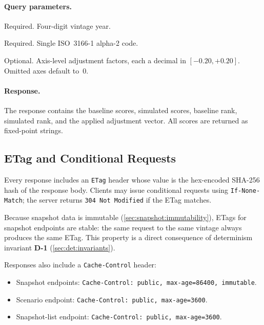 \paragraph{Query parameters.}
\begin{description}[style=nextline, leftmargin=5em, labelwidth=4.5em]
  \item[\texttt{vintage}] Required.  Four-digit vintage year.
  \item[\texttt{country}] Required.  Single ISO~3166-1 alpha-2 code.
  \item[\texttt{a1} \ldots\ \texttt{a6}] Optional.  Axis-level adjustment
    factors, each a decimal in \([-0.20, +0.20]\).  Omitted axes default
    to~\(0\).
\end{description}

\paragraph{Response.}
The response contains the baseline scores, simulated scores, baseline rank,
simulated rank, and the applied adjustment vector.  All scores are returned
as fixed-point strings.

\subsection{ETag and Conditional Requests}\label{sec:api:etag}

Every response includes an \texttt{ETag} header whose value is the
hex-encoded SHA-256 hash of the response body.  Clients may issue
conditional requests using \texttt{If-None-Match}; the server returns
\texttt{304 Not Modified} if the ETag matches.

Because snapshot data is immutable (\cref{sec:snapshot:immutability}),
ETags for snapshot endpoints are stable: the same request to the same
vintage always produces the same ETag.  This property is a direct
consequence of determinism invariant \textbf{D-1}
(\cref{sec:det:invariants}).

Responses also include a \texttt{Cache-Control} header:
\begin{itemize}
  \item Snapshot endpoints:\newline
        \texttt{Cache-Control:\ public,\ max-age=86400,\ immutable}.
  \item Scenario endpoint:
        \texttt{Cache-Control:\ public,\ max-age=3600}.
  \item Snapshot-list endpoint:
        \texttt{Cache-Control:\ public,\ max-age=3600}.
\end{itemize}

